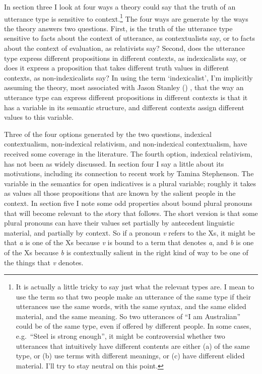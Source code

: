\documentclass[
  11pt,
  letterpaper,
  DIV=11,
  numbers=noendperiod,
  twoside]{scrartcl}
\begin{document}
In section three I look at four ways a theory could say that the truth
of an utterance type is sensitive to context.\footnote{It is actually a
  little tricky to say just what the relevant types are. I mean to use
  the term so that two people make an utterance of the same type if
  their utterances use the same words, with the same syntax, and the
  same elided material, and the same meaning. So two utterances of ``I
  am Australian'' could be of the same type, even if offered by
  different people. In some cases, e.g.~``Steel is strong enough'', it
  might be controversial whether two utterances that intuitively have
  different contents are either (a) of the same type, or (b) use terms
  with different meanings, or (c) have different elided material. I'll
  try to stay neutral on this point.} The four ways are generate by the
ways the theory answers two questions. First, is the truth of the
utterance type sensitive to facts about the context of utterance, as
contextualists say, or to facts about the context of evaluation, as
relativists say? Second, does the utterance type express different
propositions in different contexts, as indexicalists say, or does it
express a proposition that takes different truth values in different
contexts, as non-indexicalists say? In using the term `indexicalist',
I'm implicitly assuming the theory, most associated with Jason Stanley
() , that the way an utterance
type can express different propositions in different contexts is that it
has a variable in its semantic structure, and different contexts assign
different values to this variable.

Three of the four options generated by the two questions, indexical
contextualism, non-indexical relativism, and non-indexical
contextualism, have received some coverage in the literature. The fourth
option, indexical relativism, has not been as widely discussed. In
section four I say a little about its motivations, including its
connection to recent work by Tamina Stephenson. The variable in the
semantics for open indicatives is a plural variable; roughly it takes as
values all those propositions that are known by the salient people in
the context. In section five I note some odd properties about bound
plural pronouns that will become relevant to the story that follows. The
short version is that some plural pronouns can have their values set
partially by antecedent linguistic material, and partially by context.
So if a pronoun \emph{v} refers to the Xs, it might be that \emph{a} is
one of the Xs because \emph{v} is bound to a term that denotes \emph{a},
and \emph{b} is one of the Xs because \emph{b} is contextually salient
in the right kind of way to be one of the things that \emph{v} denotes.
\end{document}
